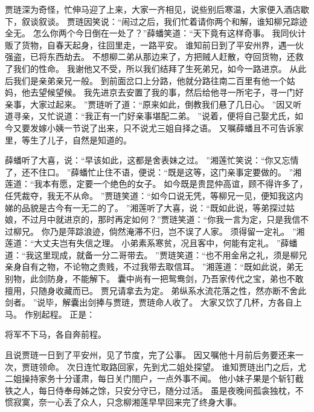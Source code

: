 贾琏深为奇怪，忙伸马迎了上来，大家一齐相见，说些别后寒温，大家便入酒店歇下，叙谈叙谈。
贾琏因笑说：“闹过之后，我们忙着请你两个和解，谁知柳兄踪迹全无。
怎么你两个今日倒在一处了？”薛蟠笑道：“天下竟有这样奇事。
我同伙计贩了货物，自春天起身，往回里走，一路平安。
谁知前日到了平安州界，遇一伙强盗，已将东西劫去。
不想柳二弟从那边来了，方把贼人赶散，夺回货物，还救了我们的性命。
我谢他又不受，所以我们结拜了生死弟兄，如今一路进京。
从此后我们是亲弟亲兄一般。
到前面岔口上分路，他就分路往南二百里有他一个姑妈，他去望候望候。
我先进京去安置了我的事，然后给他寻一所宅子，寻一门好亲事，大家过起来。
”贾琏听了道：“原来如此，倒教我们悬了几日心。
”因又听道寻亲，又忙说道：“我正有一门好亲事堪配二弟。
”说着，便将自己娶尤氏，如今又要发嫁小姨一节说了出来，只不说尤三姐自择之语。
又嘱薛蟠且不可告诉家里，等生了儿子，自然是知道的。
\par
薛蟠听了大喜，说：“早该如此，这都是舍表妹之过。
”湘莲忙笑说：“你又忘情了，还不住口。
”薛蟠忙止住不语，便说：“既是这等，这门亲事定要做的。
”湘莲道：“我本有愿，定要一个绝色的女子。
如今既是贵昆仲高谊，顾不得许多了，任凭裁夺，我无不从命。
”贾琏笑道：“如今口说无凭，等柳兄一见，便知我这内娣的品貌是古今有一无二的了。
”湘莲听了大喜，说：“既如此说，等弟探过姑娘，不过月中就进京的，那时再定如何？”贾琏笑道：“你我一言为定，只是我信不过柳兄。
你乃是萍踪浪迹，倘然淹滞不归，岂不误了人家。
须得留一定礼。
”湘莲道：“大丈夫岂有失信之理。
小弟素系寒贫，况且客中，何能有定礼。
”薛蟠道：“我这里现成，就备一分二哥带去。
”贾琏笑道：“也不用金帛之礼，须是柳兄亲身自有之物，不论物之贵贱，不过我带去取信耳。
”湘莲道：“既如此说，弟无别物，此剑防身，不能解下。
囊中尚有一把鸳鸯剑，乃吾家传代之宝，弟也不敢擅用，只随身收藏而已。
贾兄请拿去为定。
弟纵系水流花落之性，然亦断不舍此剑者。
”说毕，解囊出剑捧与贾琏，贾琏命人收了。
大家又饮了几杯，方各自上马。
作别起程。
 正是：\par
\hop
将军不下马，各自奔前程。
\par
\hop
且说贾琏一日到了平安州，见了节度，完了公事。
因又嘱他十月前后务要还来一次，贾琏领命。
次日连忙取路回家，先到尤二姐处探望。
谁知贾琏出门之后，尤二姐操持家务十分谨肃，每日关门閤户，一点外事不闻。
他小妹子果是个斩钉截铁之人，每日侍奉母姊之馀，只安分守已，随分过活。
虽是夜晚间孤衾独枕，不惯寂寞，奈一心丢了众人，只念柳湘莲早早回来完了终身大事。
